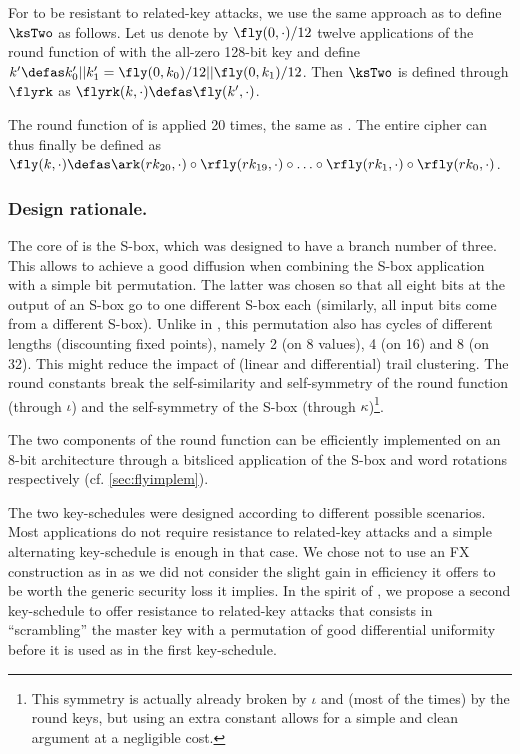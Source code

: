 \medskip

For \fly to be resistant to related-key attacks, we use the same approach as \noekeon \cite{noekeon} to define $\ksTwo$ as follows. Let us denote by $\fly(0, \cdot)/12$ twelve applications of the round function of \fly
with the all-zero 128-bit key and define $k' \defas k_0'||k_1' = \fly(0, k_0)/12||\linebreak \fly(0, k_1)/12$. Then $\ksTwo$ is defined through $\flyrk$ as $\flyrk(k, \cdot) \defas \fly(k', \cdot)$. 

\medskip

The round function of \fly is applied 20 times, the same as \pride. The entire cipher can thus finally be defined
as $\fly(k,\cdot) \defas \ark(rk_{20},\cdot) \circ \rfly(rk_{19}, \cdot) \circ \ldots \circ \rfly(rk_1, \cdot) \circ \rfly(rk_0,\cdot)$.


\subsubsection*{Design rationale.}
The core of \fly is the \littlunOne S-box, which was designed to have a branch number of three. This allows to achieve a good diffusion when combining the S-box
application with a simple bit permutation. The latter was chosen so that all eight bits at the output of an S-box go to one different S-box each (similarly, all
input bits come from a different S-box). Unlike in \present, this permutation also has cycles of different lengths (discounting fixed points),
namely 2 (on 8 values), 4 (on 16) and 8 (on 32). This might reduce the impact of (linear and differential) trail clustering.
The round constants break the self-similarity and self-symmetry of the round function (through $\iota$)
and the self-symmetry of the S-box (through $\kappa$)\footnote{This symmetry is actually already broken by $\iota$ and (most of the times) by the round keys, but using an
extra constant allows for a simple and clean argument at a negligible cost.}.

The two components of the round function can be efficiently implemented on an 8-bit architecture through a bitsliced
application of the S-box and word rotations respectively (cf. \autoref{sec:flyimplem}).

The two key-schedules were designed according to different possible scenarios. Most applications do not require resistance to related-key attacks and a simple
alternating key-schedule is enough in that case. We chose not to use an FX construction as in \pride as we did not consider the slight gain in efficiency
it offers to be worth the generic security loss it implies. In the spirit of \noekeon, we propose a second key-schedule to offer resistance to related-key attacks
that consists in ``scrambling'' the master key with a permutation of good differential uniformity before it is used as in the first key-schedule.

